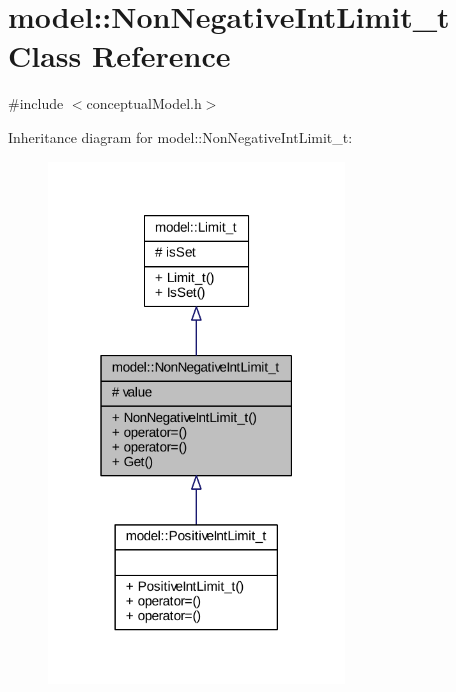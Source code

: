 \hypertarget{classmodel_1_1_non_negative_int_limit__t}{}\section{model\+:\+:Non\+Negative\+Int\+Limit\+\_\+t Class Reference}
\label{classmodel_1_1_non_negative_int_limit__t}


{\ttfamily \#include $<$conceptual\+Model.\+h$>$}



Inheritance diagram for model\+:\+:Non\+Negative\+Int\+Limit\+\_\+t\+:
\nopagebreak
\begin{figure}[H]
\begin{center}
\leavevmode
\includegraphics[width=223pt]{classmodel_1_1_non_negative_int_limit__t__inherit__graph}
\end{center}
\end{figure}


